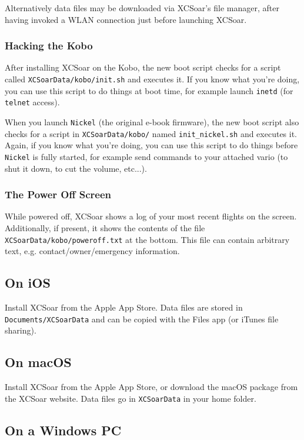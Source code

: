 Alternatively data files may be downloaded via XCSoar's file manager,
after having invoked a WLAN connection just before launching XCSoar.

\subsubsection{Hacking the Kobo}

After installing XCSoar on the Kobo, the new boot script checks for a
script called \texttt{XCSoarData/kobo/init.sh} and executes it.  If
you know what you're doing, you can use this script to do things at
boot time, for example launch \texttt{inetd} (for \texttt{telnet}
access).

When you launch \texttt{Nickel} (the original e-book firmware), the new
boot script also checks for a script in \texttt{XCSoarData/kobo/} named
\texttt{init\_nickel.sh} and executes it. Again, if
you know what you're doing, you can use this script to do things
before \texttt{Nickel} is fully started, for example send commands
to your attached vario (to shut it down, to cut the volume, etc...).

\subsubsection{The Power Off Screen}

While powered off, XCSoar shows a log of your most recent flights on
the screen.  Additionally, if present, it shows the contents of the
file \texttt{XCSoarData/kobo/poweroff.txt} at the bottom.  This file
can contain arbitrary text, e.g. contact/owner/emergency information.

\subsection*{On iOS}

Install XCSoar from the Apple App Store.  Data files are stored in
\texttt{Documents/XCSoarData} and can be copied with the Files app
(or iTunes file sharing).

\subsection*{On macOS}

Install XCSoar from the Apple App Store, or download the macOS package
from the XCSoar website.  Data files go in \texttt{XCSoarData} in your
home folder.

\subsection*{On a Windows PC}


